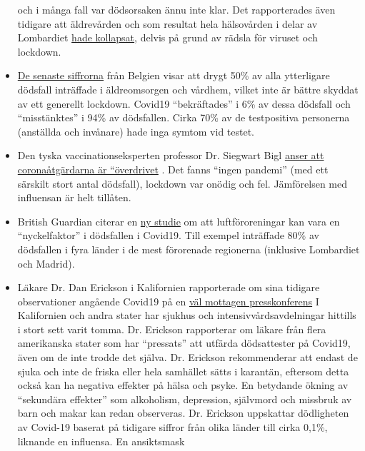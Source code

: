 \begin{itemize}
  och i många fall var dödsorsaken ännu inte klar. Det rapporterades
  även tidigare att äldrevården och som resultat hela hälsovården i
  delar av Lombardiet
  \href{https://swprs.org/covid19-bericht-aus-italien/}{hade kollapsat},
  delvis på grund av rädsla för viruset och lockdown.
\item
  \href{https://covid-19.sciensano.be/sites/default/files/Covid19/Meest\%20recente\%20update.pdf}{De
  senaste siffrorna} från Belgien visar att drygt 50\% av alla
  ytterligare dödsfall inträffade i äldreomsorgen och vårdhem, vilket
  inte är bättre skyddat av ett generellt lockdown. Covid19
  ``bekräftades'' i 6\% av dessa dödsfall och ``misstänktes'' i 94\% av
  dödsfallen. Cirka 70\% av de testpositiva personerna (anställda och
  invånare) hade inga symtom vid testet.
\item
  Den tyska vaccinationseksperten professor Dr. Siegwart Bigl
  \href{https://www.pressreader.com/germany/dresdner-neueste-nachrichten/20200423/281496458428447}{anser
  att coronaåtgärdarna är ``överdrivet} . Det fanns ``ingen pandemi''
  (med ett särskilt stort antal dödsfall), lockdown var onödig och fel.
  Jämförelsen med influensan är helt tillåten.
\item
  British Guardian citerar en
  \href{https://www.theguardian.com/environment/2020/apr/20/air-pollution-may-be-key-contributor-to-covid-19-deaths-study?utm_medium}{ny
  studie} om att luftföroreningar kan vara en ``nyckelfaktor'' i
  dödsfallen i Covid19. Till exempel inträffade 80\% av dödsfallen i
  fyra länder i de mest förorenade regionerna (inklusive Lombardiet och
  Madrid).
\item
  Läkare Dr. Dan Erickson i Kalifornien rapporterade om sina tidigare
  observationer angående Covid19 på en
  \href{https://www.youtube.com/watch?v=xfLVxx_lBLU}{väl mottagen
  presskonferens} I Kalifornien och andra stater har sjukhus och
  intensivvårdsavdelningar hittills i stort sett varit tomma. Dr.
  Erickson rapporterar om läkare från flera amerikanska stater som har
  ``pressats'' att utfärda dödsattester på Covid19, även om de inte
  trodde det själva. Dr. Erickson rekommenderar att endast de sjuka och
  inte de friska eller hela samhället sätts i karantän, eftersom detta
  också kan ha negativa effekter på hälsa och psyke. En betydande ökning
  av ``sekundära effekter'' som alkoholism, depression, självmord och
  missbruk av barn och makar kan redan observeras. Dr. Erickson
  uppskattar dödligheten av Covid-19 baserat på tidigare siffror från
  olika länder till cirka 0,1\%, liknande en influensa. En ansiktsmask

\end{itemize}
